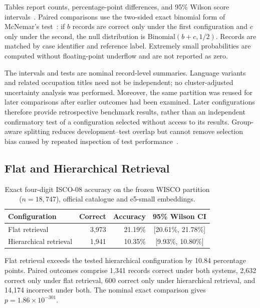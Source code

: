 Tables report counts, percentage-point differences, and 95\% Wilson score
intervals~\cite{wilson1927}. Paired comparisons use the two-sided exact
binomial form of McNemar's test~\cite{mcnemar1947}: if $b$ records are correct only under the
first configuration and $c$ only under the second, the null distribution
is $\mathrm{Binomial}(b+c,1/2)$. Records are matched by case identifier and
reference label. Extremely small probabilities are computed without
floating-point underflow and are not reported as zero.

The intervals and tests are nominal record-level summaries. Language
variants and related occupation titles need not be independent; no
cluster-adjusted uncertainty analysis was performed. Moreover, the same
partition was reused for later comparisons after earlier outcomes had
been examined. Later configurations therefore provide retrospective
benchmark results, rather than an independent confirmatory test of a
configuration selected without access to its results. Group-aware splitting
reduces development--test overlap but cannot remove selection bias caused
by repeated inspection of test performance~\cite{cawley2010}.

\subsection{Flat and Hierarchical Retrieval}

\begin{table}[htbp]
\centering
\caption{Exact four-digit ISCO-08 accuracy on the frozen WISCO partition
($n=18,747$), official catalogue and e5-small embeddings.}
\label{tab:ch6-wisco-canonical}
\small\renewcommand{\arraystretch}{1.3}
\begin{tabular}{lrrc}
\toprule
\textbf{Configuration} & \textbf{Correct} & \textbf{Accuracy} & \textbf{95\% Wilson CI} \\
\midrule
Flat retrieval & 3,973 & 21.19\% & [20.61\%, 21.78\%] \\
Hierarchical retrieval & 1,941 & 10.35\% & [9.93\%, 10.80\%] \\
\bottomrule
\end{tabular}
\end{table}

Flat retrieval exceeds the tested hierarchical configuration by 10.84
percentage points. Paired outcomes comprise 1,341 records correct under
both systems, 2,632 correct only under flat retrieval, 600 correct only
under hierarchical retrieval, and 14,174 incorrect under both. The nominal
exact comparison gives $p=1.86\times10^{-301}$.

